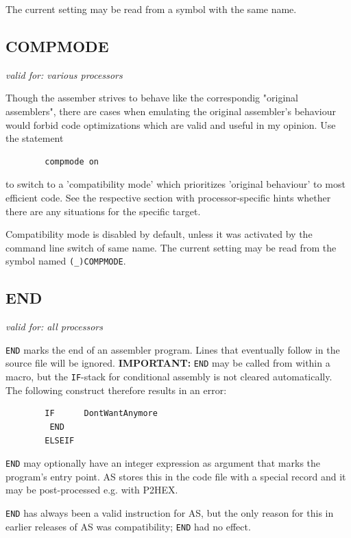 \documentclass[12pt,twoside]{report}
\makeatletter
\newcommand{\bb}[1]{{\bf #1}}
\newcommand{\tty}[1]{{\tt #1}}
\newcommand{\ttindex}[1]{\index{#1@{\tt #1}}}
\newcommand{\asname}{{AS}}
\newcommand{\predefsym}[1]{{\tt (\_)#1}}
\makeatother
\begin{document}
The current setting may be read from a symbol with the same name.


\subsection{COMPMODE}
\label{SectCompMode}
\ttindex{COMPMODE}

{\em valid for: various processors}

Though the assember strives to behave like the correspondig "original
assemblers", there are cases when emulating the original assembler's
behaviour would forbid code optimizations which are valid and useful in
my opinion.  Use the statement
\begin{verbatim}
        compmode on
\end{verbatim}
to switch to a 'compatibility mode' which prioritizes 'original behaviour'
to most efficient code.  See the respective section with processor-specific
hints whether there are any situations for the specific target.
\par
Compatibility mode is disabled by default, unless it was activated by the
command line switch of same name.  The current setting may be read from the
symbol named \predefsym{COMPMODE}.


\subsection{END}
\ttindex{END}

{\em valid for: all processors}

\tty{END} marks the end of an assembler program.  Lines that eventually
follow in the source file will be ignored.  \bb{IMPORTANT:} \tty{END} may
be called from within a macro, but the \tty{IF}-stack for conditional
assembly is not cleared automatically.  The following construct therefore
results in an error:
\begin{verbatim}
        IF      DontWantAnymore
         END
        ELSEIF
\end{verbatim}
\tty{END} may optionally have an integer expression as argument that marks
the program's entry point.  \asname{} stores this in the code file with a special
record and it may be post-processed e.g. with P2HEX.

\tty{END} has always been a valid instruction for \asname{}, but the only reason
for this in earlier releases of \asname{} was compatibility; \tty{END} had no
effect.
\end{document}
